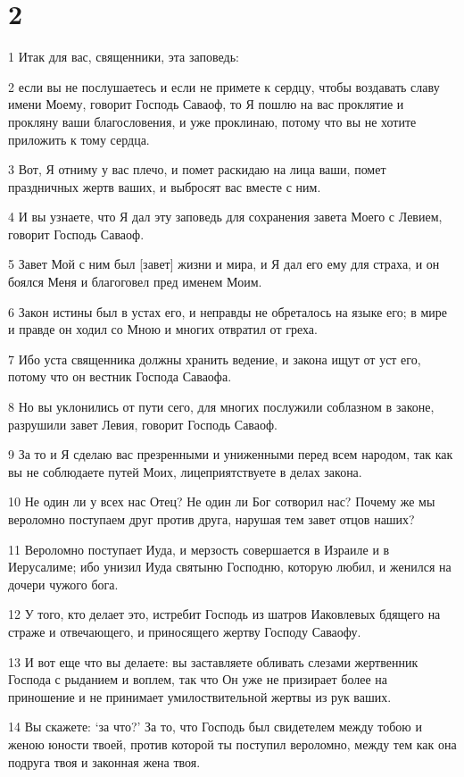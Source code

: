 \chapter{2}

\par 1 Итак для вас, священники, эта заповедь:
\par 2 если вы не послушаетесь и если не примете к сердцу, чтобы воздавать славу имени Моему, говорит Господь Саваоф, то Я пошлю на вас проклятие и прокляну ваши благословения, и уже проклинаю, потому что вы не хотите приложить к тому сердца.
\par 3 Вот, Я отниму у вас плечо, и помет раскидаю на лица ваши, помет праздничных жертв ваших, и выбросят вас вместе с ним.
\par 4 И вы узнаете, что Я дал эту заповедь для сохранения завета Моего с Левием, говорит Господь Саваоф.
\par 5 Завет Мой с ним был [завет] жизни и мира, и Я дал его ему для страха, и он боялся Меня и благоговел пред именем Моим.
\par 6 Закон истины был в устах его, и неправды не обреталось на языке его; в мире и правде он ходил со Мною и многих отвратил от греха.
\par 7 Ибо уста священника должны хранить ведение, и закона ищут от уст его, потому что он вестник Господа Саваофа.
\par 8 Но вы уклонились от пути сего, для многих послужили соблазном в законе, разрушили завет Левия, говорит Господь Саваоф.
\par 9 За то и Я сделаю вас презренными и униженными перед всем народом, так как вы не соблюдаете путей Моих, лицеприятствуете в делах закона.
\par 10 Не один ли у всех нас Отец? Не один ли Бог сотворил нас? Почему же мы вероломно поступаем друг против друга, нарушая тем завет отцов наших?
\par 11 Вероломно поступает Иуда, и мерзость совершается в Израиле и в Иерусалиме; ибо унизил Иуда святыню Господню, которую любил, и женился на дочери чужого бога.
\par 12 У того, кто делает это, истребит Господь из шатров Иаковлевых бдящего на страже и отвечающего, и приносящего жертву Господу Саваофу.
\par 13 И вот еще что вы делаете: вы заставляете обливать слезами жертвенник Господа с рыданием и воплем, так что Он уже не призирает более на приношение и не принимает умилоствительной жертвы из рук ваших.
\par 14 Вы скажете: `за что?' За то, что Господь был свидетелем между тобою и женою юности твоей, против которой ты поступил вероломно, между тем как она подруга твоя и законная жена твоя.
